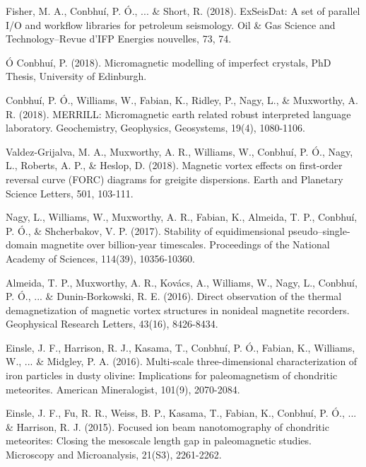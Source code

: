 \documentclass[11pt]{article}
\newenvironment{resumeSubSectionBody}{
    \par
    \vspace{-0.2\parskip}
    \begin{small}
    \par
} {
    \par
    \end{small}
    \par
}
\begin{document}
%
%
\begin{resumeSubSectionBody}

    Fisher, M. A., Conbhuí, P. Ó., ... {\&} Short, R. (2018). ExSeisDat: A set of parallel I/O and
    workflow libraries for petroleum seismology. Oil {\&} Gas Science and
    Technology–Revue d’IFP Energies nouvelles, 73, 74.

    Ó Conbhuí, P. (2018). Micromagnetic modelling of imperfect crystals, PhD
    Thesis, University of Edinburgh.

    Conbhuí, P. Ó., Williams, W., Fabian, K., Ridley, P., Nagy, L., {\&}
    Muxworthy, A. R. (2018). MERRILL: Micromagnetic earth related robust
    interpreted language laboratory. Geochemistry, Geophysics, Geosystems,
    19(4), 1080-1106.

    Valdez-Grijalva, M. A., Muxworthy, A. R., Williams, W., Conbhuí, P. Ó.,
    Nagy, L., Roberts, A. P., {\&} Heslop, D. (2018). Magnetic vortex effects on
    first-order reversal curve (FORC) diagrams for greigite dispersions. Earth
    and Planetary Science Letters, 501, 103-111.

    Nagy, L., Williams, W., Muxworthy, A. R., Fabian, K., Almeida, T. P.,
    Conbhuí, P. Ó., {\&} Shcherbakov, V. P. (2017). Stability of equidimensional
    pseudo–single-domain magnetite over billion-year timescales. Proceedings of
    the National Academy of Sciences, 114(39), 10356-10360.

    Almeida, T. P., Muxworthy, A. R., Kov\'acs, A., Williams, W., Nagy, L.,
    Conbhu\'i, P. \'O., ... {\&} Dunin-Borkowski, R. E. (2016). Direct
    observation of the thermal demagnetization of magnetic vortex structures in
    nonideal magnetite recorders. Geophysical Research Letters, 43(16),
    8426-8434.

    Einsle, J. F., Harrison, R. J., Kasama, T., Conbhu\'i, P. \'O., Fabian, K.,
    Williams, W., ... {\&} Midgley, P. A. (2016). Multi-scale three-dimensional
    characterization of iron particles in dusty olivine: Implications for
    paleomagnetism of chondritic meteorites. American Mineralogist, 101(9),
    2070-2084.

    Einsle, J. F., Fu, R. R., Weiss, B. P., Kasama, T., Fabian, K., Conbhu\'i,
    P.  \'O., ... {\&} Harrison, R. J. (2015). Focused ion beam nanotomography
    of chondritic meteorites: Closing the mesoscale length gap in paleomagnetic
    studies. Microscopy and Microanalysis, 21(S3), 2261-2262.

\end{resumeSubSectionBody}


\end{document}

